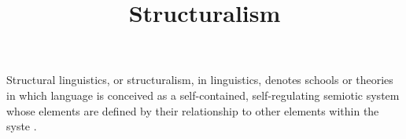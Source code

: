 \documentclass[a4paper]{article}
\title{Structuralism}
\date{}
\begin{document}
\maketitle
    Structural linguistics, or structuralism, in linguistics, denotes schools or theories in which language is conceived as a self-contained, self-regulating semiotic system whose elements are defined by their relationship to other elements within the syste .
    
    
\end{document}
